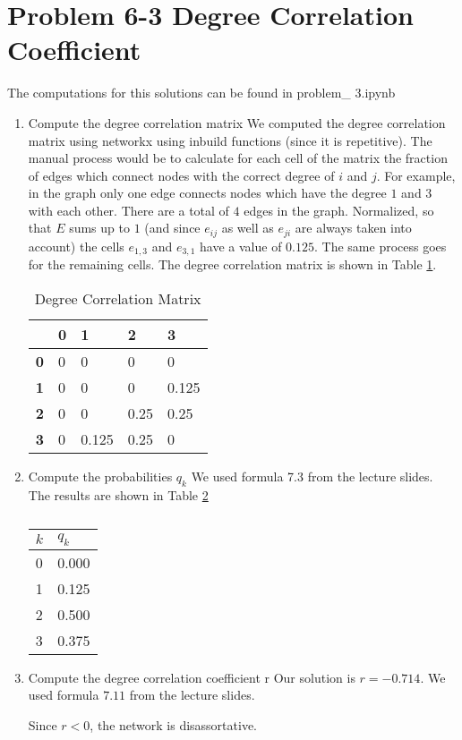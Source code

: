 \section{Problem 6-3 Degree Correlation Coefficient}
The computations for this solutions can be found in problem\_ 3.ipynb
\begin{enumerate}
	\item Compute the degree correlation matrix
	We computed the degree correlation matrix using networkx using inbuild functions (since it is repetitive).  The manual process would be to calculate for each cell of the matrix the fraction of edges which connect nodes with the correct degree of $i$ and $j$.  For example,  in the graph only one edge connects nodes which have the degree $1$ and $3$ with each other.  There are a total of $4$ edges in the graph.  Normalized, so that $E$ sums up to $1$ (and since $e_{ij}$ as well as $e_{ji}$ are always taken into account) the cells $e_{1,3}$ and $e_{3,1}$ have a value of $0.125$. The same process goes for the remaining cells. The degree correlation matrix is shown in Table \ref{tab:deg_corr_mat}.
	
	\begin{table}[]
\centering
\begin{tabular}{lllll}
\hline
\textbf{}  & \textbf{0} & \textbf{1} & \textbf{2} & \textbf{3} \\ \hline
\textbf{0} & 0          & 0          & 0          & 0          \\ \hline
\textbf{1} & 0          & 0          & 0          & 0.125      \\ \hline
\textbf{2} & 0          & 0          & 0.25       & 0.25       \\ \hline
\textbf{3} & 0          & 0.125      & 0.25       & 0          \\ \hline
\end{tabular}
\caption{Degree Correlation Matrix}
\label{tab:deg_corr_mat}
\end{table}
	
	\item Compute the probabilities $q_k$
	We used formula 7.3 from the lecture slides.  The results are shown in Table \ref{tab:qk}
	
	\begin{table}[]
\centering
\begin{tabular}{|l|l|}
\hline
\textbf{$k$} & \textbf{$q_k$} \\ \hline
0          & 0.000         \\ \hline
1          & 0.125         \\ \hline
2          & 0.500         \\ \hline
3          & 0.375         \\ \hline
\end{tabular}
\caption{}
\label{tab:qk}
\end{table}

  \item Compute the degree correlation coefficient r
  Our solution is $r = -0.714$. We used formula $7.11$ from the lecture slides. 
  
  Since $r < 0$, the network is disassortative.
\end{enumerate}